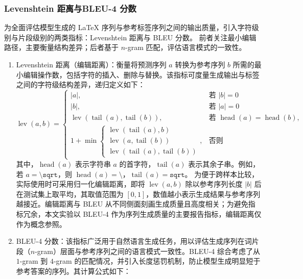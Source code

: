 \subsubsection{Levenshtein 距离与BLEU-4 分数}
为全面评估模型生成的 LaTeX 序列与参考标签序列之间的输出质量，引入字符级别与片段级别的两类指标：Levenshtein 距离与 BLEU 分数。
前者关注最小编辑路径，主要衡量结构差异；后者基于 $n$-gram 匹配，评估语言模式的一致性。
\begin{enumerate}[label={（\arabic*）}, leftmargin=2em, labelsep=0.5em, itemsep=0pt]
    \item Levenshtein 距离（编辑距离）：衡量将预测序列 $a$ 转换为参考序列 $b$ 所需的最小编辑操作数，包括字符的插入、删除与替换。该指标可度量生成输出与标签之间的字符级结构差异，递归定义如下：
    \begin{equation}
    \operatorname{lev}(a, b) =
    \begin{cases}
        |a|, & \text{若 } |b| = 0 \\
        |b|, & \text{若 } |a| = 0 \\
        \operatorname{lev}(\operatorname{tail}(a), \operatorname{tail}(b)), & \text{若 } \operatorname{head}(a) = \operatorname{head}(b), \\
        1 + \min\left\{
            \begin{array}{l}
                \operatorname{lev}(\operatorname{tail}(a), b) \\
                \operatorname{lev}(a, \operatorname{tail}(b)) \\
                \operatorname{lev}(\operatorname{tail}(a), \operatorname{tail}(b))
            \end{array}
        \right., & \text{否则}
    \end{cases}
    \end{equation}
    其中，$\operatorname{head}(a)$ 表示字符串 $a$ 的首字符，$\operatorname{tail}(a)$ 表示其余子串。例如，
    若 $a = \texttt{\textbackslash sqrt}$，则 $\operatorname{head}(a) = \texttt{\textbackslash}$，$\operatorname{tail}(a) = \texttt{sqrt}$。
    为便于跨样本比较，实际使用时可采用归一化编辑距离，即将 $\operatorname{lev}(a,b)$ 除以参考序列长度 $|b|$ 后在测试集上取平均，其取值范围为 $[0,1]$，数值越小表示生成结果与参考序列越接近。编辑距离与 BLEU 从不同侧面刻画生成质量且高度相关；为避免指标冗余，本文实验以 BLEU-4 作为序列生成质量的主要报告指标，编辑距离仅作为概念参照。
\item BLEU-4 分数：该指标广泛用于自然语言生成任务，用以评估生成序列在词片段（$n$-gram）层面与参考序列之间的语言模式一致性。BLEU-4 综合考虑了从 $1$-gram 到 $4$-gram 的匹配情况，并引入长度惩罚机制，防止模型生成明显短于参考答案的序列。其计算公式如下：

\end{enumerate}
